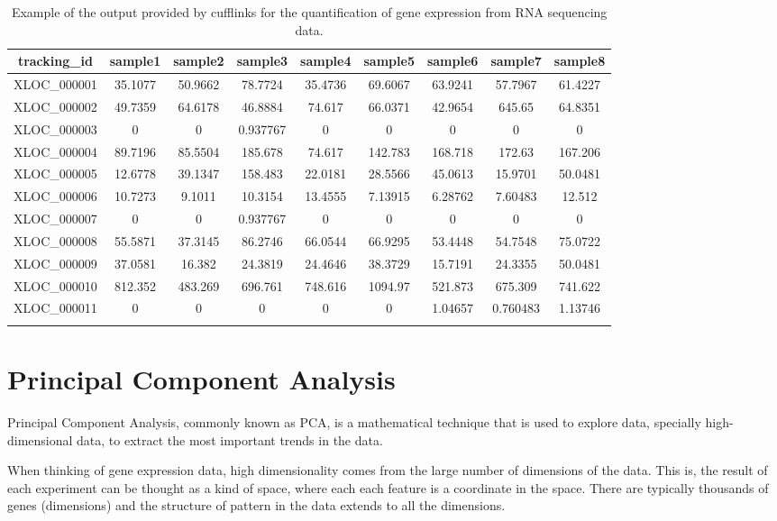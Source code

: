 \documentclass[11pt, oneside]{article}   	%
\begin{document}
\begin{table}[ht]
    \centering
    \caption{Example of the output provided by cufflinks for the quantification of gene expression from RNA sequencing data.}
    \begin{tabular}{c|c|c|c|c|c|c|c|c}
    tracking\_id & sample1 & sample2 & sample3 & sample4 & sample5 & sample6 & sample7 & sample8 \\
    \hline
    XLOC\_000001 & 35.1077 & 50.9662 & 78.7724 & 35.4736 & 69.6067 & 63.9241 & 57.7967 & 61.4227 \\
    XLOC\_000002 & 49.7359 & 64.6178 & 46.8884 & 74.617 & 66.0371 & 42.9654 & 645.65 & 64.8351 \\
    XLOC\_000003 & 0 & 0 & 0.937767 & 0 & 0 & 0 & 0 & 0\\
    XLOC\_000004 & 89.7196 & 85.5504 & 185.678 & 74.617 & 142.783 & 168.718 & 172.63 & 167.206 \\
    XLOC\_000005 & 12.6778 & 39.1347 & 158.483 & 22.0181 & 28.5566 & 45.0613 & 15.9701 & 50.0481 \\
    XLOC\_000006 & 10.7273 & 9.1011 & 10.3154 & 13.4555 & 7.13915 & 6.28762 & 7.60483 & 12.512 \\
    XLOC\_000007 & 0 & 0 & 0.937767 & 0 & 0 & 0 & 0 & 0 \\
    XLOC\_000008 & 55.5871 & 37.3145 & 86.2746 & 66.0544 & 66.9295 & 53.4448 & 54.7548 & 75.0722 \\
    XLOC\_000009 & 37.0581 & 16.382 & 24.3819 & 24.4646 & 38.3729 & 15.7191 & 24.3355 & 50.0481 \\
    XLOC\_000010 & 812.352 & 483.269 & 696.761 & 748.616 & 1094.97 & 521.873 & 675.309 & 741.622 \\
    XLOC\_000011 & 0 & 0 & 0 & 0 & 0 & 1.04657 & 0.760483 & 1.13746\\
    \hline
    \label{tab:ExpressionCufflinks}
    \end{tabular}
\end{table}




\section{Principal Component Analysis}

Principal Component Analysis, commonly known as PCA, is a mathematical technique that is used to explore data, specially high-dimensional data, to extract the most important trends in the data.

When thinking of gene expression data, high dimensionality comes from the large number of dimensions of the data. This is, the result of each experiment can be thought as a kind of space, where each each feature is a coordinate in the space. There are typically thousands of genes (dimensions) and the structure of pattern in the data extends to all the dimensions. 
\end{document}
